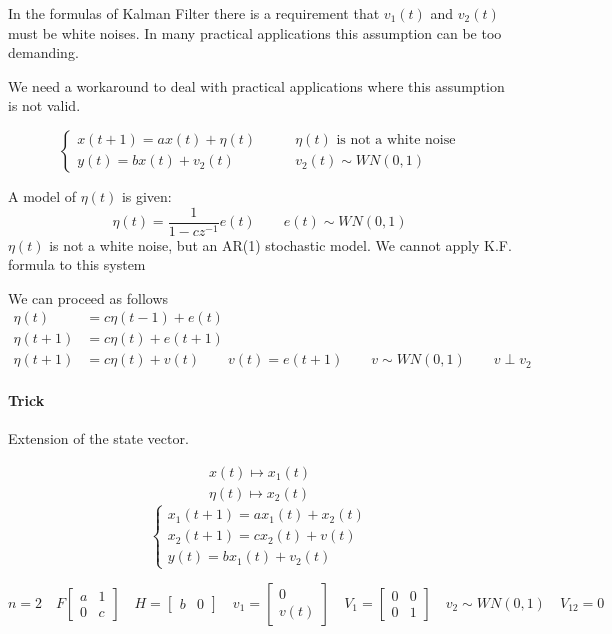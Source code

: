 
\begin{remark}
    In the formulas of Kalman Filter there is a requirement that $v_1(t)$ and $v_2(t)$ must be white noises.
    In many practical applications this assumption can be too demanding.

    We need a workaround to deal with practical applications where this assumption is not valid.

    \[
        \begin{cases}
            x(t+1) = ax(t) + \eta(t) \qquad & \eta(t) \text{ is not a white noise}\\
            y(t) = bx(t) + v_2(t) \qquad & v_2(t) \sim WN(0,1)
        \end{cases}
    \]

    A model of $\eta(t)$ is given:
    \[
        \eta(t) = \frac{1}{1-cz^{-1}}e(t) \qquad e(t) \sim WN(0,1)
    \]
    $\eta(t)$ is not a white noise, but an AR(1) stochastic model.
    We cannot apply K.F. formula to this system

    We can proceed as follows
    \begin{align*}
        \eta(t) &= c\eta(t-1) + e(t) \\
        \eta(t+1) &= c\eta(t) + e(t+1) \\
        \eta(t+1) &= c\eta(t) + v(t) \qquad v(t) = e(t+1) \qquad v \sim WN(0,1) \qquad v \perp v_2
    \end{align*}

    \paragraph{Trick} Extension of the state vector.

    \begin{align*}
        x(t) \mapsto x_1(t) \\
        \eta(t) \mapsto x_2(t)
    \end{align*}
    \[
        \begin{cases}
            x_1(t+1) = ax_1(t) + x_2(t) \\
            x_2(t+1) = cx_2(t) + v(t) \\
            y(t) = bx_1(t) + v_2(t)
        \end{cases}
    \]

    \[
        n=2 \quad F\begin{bmatrix}
            a & 1 \\
            0 & c
        \end{bmatrix}
        \quad H = \begin{bmatrix}
            b & 0
        \end{bmatrix}
        \quad v_1 = \begin{bmatrix}
            0 \\ v(t)
        \end{bmatrix}
        \quad V_1 = \begin{bmatrix}
            0 & 0 \\
            0 & 1
        \end{bmatrix}
        \quad v_2 \sim WN(0,1)
        \quad V_{12} = 0
    \]


\end{remark}
